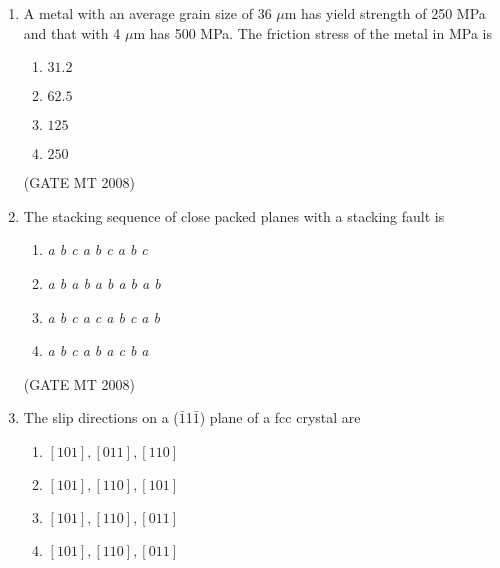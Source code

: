 \documentclass[11pt, letterpaper]{article}
\theoremstyle{remark}
\begin{document}
\begin{enumerate}
\begin{multicols}{2}
\begin{enumerate}
\item elutriation velocity
\item terminal velocity
\item minimum fluidization velocity
\item superficial velocity
\end{enumerate}
\end{multicols}

\hfill(GATE MT 2008)

\item A metal with an average grain size of 36 $\mu$m has yield strength of 250 MPa and that with 4 $\mu$m has 500 MPa. The friction stress of the metal in MPa is

\begin{multicols}{4}
\begin{enumerate}
\item $31.2$
\item $62.5$
\item $125$
\item $250$
\end{enumerate}
\end{multicols}

\hfill(GATE MT 2008)

\item The stacking sequence of close packed planes with a stacking fault is

\begin{multicols}{2}
\begin{enumerate}
\item \textit{a b c a b c a b c}
\item \textit{a b a b a b a b a b}
\item \textit{a b c a c a b c a b}
\item \textit{a b c a b a c b a}
\end{enumerate}
\end{multicols}

\hfill(GATE MT 2008)

\item The slip directions on a ($\bar{1}$1$\bar{1}$) plane of a fcc crystal are

\begin{multicols}{2}
\begin{enumerate}
\item $[101], [011], [110]$
\item $[101], [110], [101]$
\item $[101], [110], [011]$
\item $[101], [110], [011]$
\end{enumerate}
\end{multicols}


\end{enumerate}
\end{document}
